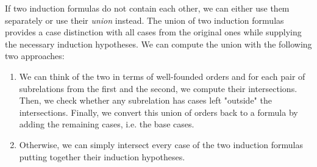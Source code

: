 If two induction formulas do not contain each other, we can either use them separately or use their \textit{union} instead. The union of two induction formulas provides a case distinction with all cases from the original ones while supplying the necessary induction hypotheses. We can compute the union with the following two approaches:
\begin{enumerate}
	\item We can think of the two in terms of well-founded orders and for each pair of subrelations from the first and the second, we compute their intersections. Then, we check whether any subrelation has cases left "outside" the intersections. Finally, we convert this union of orders back to a formula by adding the remaining cases, i.e. the base cases.
	\item Otherwise, we can simply intersect every case of the two induction formulas putting together their induction hypotheses.
\end{enumerate}
